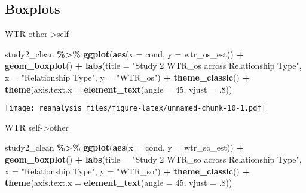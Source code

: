 \documentclass[
]{article}
\newenvironment{Shaded}{\begin{snugshade}}{\end{snugshade}}
\newcommand{\AttributeTok}[1]{\textcolor[rgb]{0.13,0.29,0.53}{#1}}
\newcommand{\DecValTok}[1]{\textcolor[rgb]{0.00,0.00,0.81}{#1}}
\newcommand{\FunctionTok}[1]{\textcolor[rgb]{0.13,0.29,0.53}{\textbf{#1}}}
\newcommand{\NormalTok}[1]{#1}
\newcommand{\SpecialCharTok}[1]{\textcolor[rgb]{0.81,0.36,0.00}{\textbf{#1}}}
\newcommand{\StringTok}[1]{\textcolor[rgb]{0.31,0.60,0.02}{#1}}
\begin{document}
\hypertarget{boxplots-1}{%
\subsection{Boxplots}\label{boxplots-1}}

WTR other-\textgreater self

\begin{Shaded}
\begin{Highlighting}[]
\NormalTok{study2\_clean }\SpecialCharTok{\%\textgreater{}\%} 
  \FunctionTok{ggplot}\NormalTok{(}\FunctionTok{aes}\NormalTok{(}\AttributeTok{x =}\NormalTok{ cond, }\AttributeTok{y =}\NormalTok{ wtr\_os\_est)) }\SpecialCharTok{+}
  \FunctionTok{geom\_boxplot}\NormalTok{() }\SpecialCharTok{+}
  \FunctionTok{labs}\NormalTok{(}\AttributeTok{title =} \StringTok{"Study 2 WTR\_os across Relationship Type"}\NormalTok{, }\AttributeTok{x =} \StringTok{"Relationship Type"}\NormalTok{, }\AttributeTok{y =} \StringTok{"WTR\_os"}\NormalTok{) }\SpecialCharTok{+}
  \FunctionTok{theme\_classic}\NormalTok{() }\SpecialCharTok{+}
  \FunctionTok{theme}\NormalTok{(}\AttributeTok{axis.text.x =} \FunctionTok{element\_text}\NormalTok{(}\AttributeTok{angle =} \DecValTok{45}\NormalTok{, }\AttributeTok{vjust =}\NormalTok{ .}\DecValTok{8}\NormalTok{))}
\end{Highlighting}
\end{Shaded}

\texttt{[image: reanalysis\_files/figure-latex/unnamed-chunk-10-1.pdf]}

WTR self-\textgreater other

\begin{Shaded}
\begin{Highlighting}[]
\NormalTok{study2\_clean }\SpecialCharTok{\%\textgreater{}\%} 
  \FunctionTok{ggplot}\NormalTok{(}\FunctionTok{aes}\NormalTok{(}\AttributeTok{x =}\NormalTok{ cond, }\AttributeTok{y =}\NormalTok{ wtr\_so\_est)) }\SpecialCharTok{+}
  \FunctionTok{geom\_boxplot}\NormalTok{() }\SpecialCharTok{+}
  \FunctionTok{labs}\NormalTok{(}\AttributeTok{title =} \StringTok{"Study 2 WTR\_so across Relationship Type"}\NormalTok{, }\AttributeTok{x =} \StringTok{"Relationship Type"}\NormalTok{, }\AttributeTok{y =} \StringTok{"WTR\_so"}\NormalTok{) }\SpecialCharTok{+}
  \FunctionTok{theme\_classic}\NormalTok{() }\SpecialCharTok{+}
  \FunctionTok{theme}\NormalTok{(}\AttributeTok{axis.text.x =} \FunctionTok{element\_text}\NormalTok{(}\AttributeTok{angle =} \DecValTok{45}\NormalTok{, }\AttributeTok{vjust =}\NormalTok{ .}\DecValTok{8}\NormalTok{))}
\end{Highlighting}
\end{Shaded}
\end{document}
